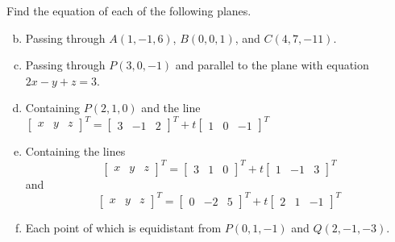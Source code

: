 \documentclass[../main.tex]{subfiles}
\begin{document}
Find the equation of each of the following planes.
\begin{enumerate}[a)]
	\setcounter{enumi}{1}
	\item Passing through $A(1, -1, 6)$, $B(0, 0, 1)$, and $C(4, 7, -11)$.
	\setcounter{enumi}{3}
	\item Passing through $P(3, 0, -1)$ and parallel to the plane with equation $2x - y + z = 3$.
	\setcounter{enumi}{5}
	\item Containing $P(2, 1, 0)$ and the line
		\(
			\begin{bmatrix}x&y&z\end{bmatrix}^T
			=
			\begin{bmatrix}3&-1&2\end{bmatrix}^T
			+
			t\begin{bmatrix}1&0&-1\end{bmatrix}^T
		\)
	\setcounter{enumi}{7}
	\item Containing the lines
		\[
			\begin{bmatrix}x&y&z\end{bmatrix}^T
			=
			\begin{bmatrix}3&1&0\end{bmatrix}^T
			+
			t\begin{bmatrix}1&-1&3\end{bmatrix}^T
		\]
		and
		\[
			\begin{bmatrix}x&y&z\end{bmatrix}^T
			=
			\begin{bmatrix}0&-2&5\end{bmatrix}^T
			+
			t\begin{bmatrix}2&1&-1\end{bmatrix}^T
		\]
	\setcounter{enumi}{9}
	\item Each point of which is equidistant from $P(0, 1, -1)$ and $Q(2, -1, -3)$.
\end{enumerate}
\end{document}
